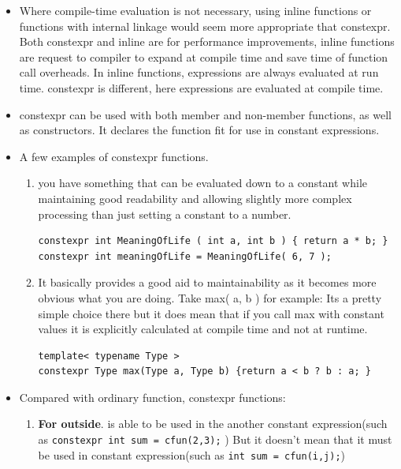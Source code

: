 \documentclass[a4paper,11pt,twoside]{book}
\begin{document}
\begin{itemize}
	\item Where compile-time evaluation is not necessary, using inline functions or functions with internal linkage would seem more appropriate that constexpr. Both constexpr and inline are for performance improvements, inline functions are request to compiler to expand at compile time and save time of function call overheads. In inline functions, expressions are always evaluated at run time. constexpr is different, here expressions are evaluated at compile time.
	
	\item constexpr can be used with both member and non-member functions, as well as constructors. It declares the function fit for use in constant expressions. 
	
	\item A few examples of constexpr functions. 
	\begin{enumerate}
		\item you have something that can be evaluated down to a constant while maintaining good readability and allowing slightly more complex processing than just setting a constant to a number.
\begin{lstlisting}[numbers=none]
constexpr int MeaningOfLife ( int a, int b ) { return a * b; }
constexpr int meaningOfLife = MeaningOfLife( 6, 7 );
\end{lstlisting}
		
		\item It basically provides a good aid to maintainability as it becomes more obvious what you are doing. Take max( a, b ) for example: Its a pretty simple choice there but it does mean that if you call max with constant values it is explicitly calculated at compile time and not at runtime.
\begin{lstlisting}[numbers=none]
template< typename Type > 
constexpr Type max(Type a, Type b) {return a < b ? b : a; }
\end{lstlisting}
		
	\end{enumerate}
	
	\item Compared with ordinary function, constexpr functions:
	\begin{enumerate}
		\item \textbf{For outside}. is able to be used in the another constant expression(such as \texttt{constexpr int sum = cfun(2,3);} ) But it doesn't mean that it must be used in constant expression(such as \texttt{int sum = cfun(i,j);})
		


\end{enumerate}
\end{itemize}
\end{document}
